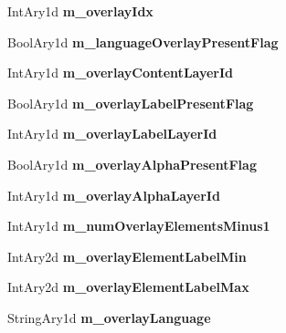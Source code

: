 \begin{DoxyCompactItemize}
Int\+Ary1d {\bfseries m\+\_\+overlay\+Idx}
\item 
\mbox{\label{class_s_e_i_overlay_info_a7780eceeda633c180d18609acc5b4228}} 
Bool\+Ary1d {\bfseries m\+\_\+language\+Overlay\+Present\+Flag}
\item 
\mbox{\label{class_s_e_i_overlay_info_a99940d02742f9f9793a2f7dfc90e7261}} 
Int\+Ary1d {\bfseries m\+\_\+overlay\+Content\+Layer\+Id}
\item 
\mbox{\label{class_s_e_i_overlay_info_a5a8c93725da9e5508fe47668e82faac5}} 
Bool\+Ary1d {\bfseries m\+\_\+overlay\+Label\+Present\+Flag}
\item 
\mbox{\label{class_s_e_i_overlay_info_ada3a51d11895241a2c3fb82ba483c957}} 
Int\+Ary1d {\bfseries m\+\_\+overlay\+Label\+Layer\+Id}
\item 
\mbox{\label{class_s_e_i_overlay_info_aa3dccf9f40a7ca9c68982503851cb619}} 
Bool\+Ary1d {\bfseries m\+\_\+overlay\+Alpha\+Present\+Flag}
\item 
\mbox{\label{class_s_e_i_overlay_info_a6098188653dbd10a818617b813630947}} 
Int\+Ary1d {\bfseries m\+\_\+overlay\+Alpha\+Layer\+Id}
\item 
\mbox{\label{class_s_e_i_overlay_info_a682bd6b738c6e0bce5a7a87d229e137e}} 
Int\+Ary1d {\bfseries m\+\_\+num\+Overlay\+Elements\+Minus1}
\item 
\mbox{\label{class_s_e_i_overlay_info_ab8091c756f98847cfe2c5f8b818880af}} 
Int\+Ary2d {\bfseries m\+\_\+overlay\+Element\+Label\+Min}
\item 
\mbox{\label{class_s_e_i_overlay_info_a5e8bcd6894972dabce7faf2d3ff53786}} 
Int\+Ary2d {\bfseries m\+\_\+overlay\+Element\+Label\+Max}
\item 
\mbox{\label{class_s_e_i_overlay_info_a97b93d215ddff6a5cdf2f3899cd11859}} 
String\+Ary1d {\bfseries m\+\_\+overlay\+Language}
\item 

\end{DoxyCompactItemize}
